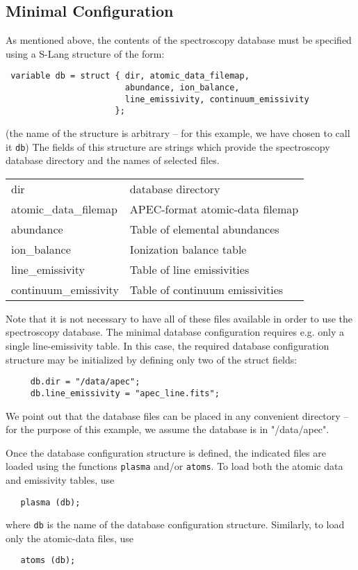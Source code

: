 \documentclass{book}
\begin{document}
{\subsection{Minimal Configuration}
\label{subsec:min-specdb}

As mentioned above, the contents of the spectroscopy database must be specified
using a S-Lang structure of the form:
\begin{verbatim}
 variable db = struct { dir, atomic_data_filemap,
                        abundance, ion_balance,
                        line_emissivity, continuum_emissivity
                      };
\end{verbatim}
(the name of the structure is arbitrary -- for this example,
we have chosen to call it {\tt db})
The fields of this structure are strings which provide the
spectroscopy database directory and the names of selected files.
\begin{center}
\begin{tabular}{|l|p{2.4in}|}
\hline
dir & database directory \\
atomic\_data\_filemap & APEC-format atomic-data filemap \\
abundance & Table of elemental abundances \\
ion\_balance & Ionization balance table \\
line\_emissivity & Table of line emissivities \\
continuum\_emissivity & Table of continuum emissivities \\
\hline
\end{tabular}
\end{center}

Note that it is not necessary to have all of these files available
in order to use the spectroscopy database. The minimal database
configuration requires e.g. only a single line-emissivity table.
In this case, the required database configuration structure may be initialized by
defining only two of the struct fields:
\begin{verbatim}
     db.dir = "/data/apec";
     db.line_emissivity = "apec_line.fits";
\end{verbatim}
We point out that the database files can be placed in any convenient
directory -- for the purpose of this example, we assume the
database is in "/data/apec".

Once the database configuration structure is defined, the indicated
files are loaded using the functions {\tt plasma} and/or {\tt atoms}.
To load both the atomic data and emissivity tables, use
\begin{verbatim}
   plasma (db);
\end{verbatim}
where {\tt db} is the name of the database configuration structure.
Similarly, to load only the atomic-data files, use
\begin{verbatim}
   atoms (db);
\end{verbatim}

}
\end{document}
